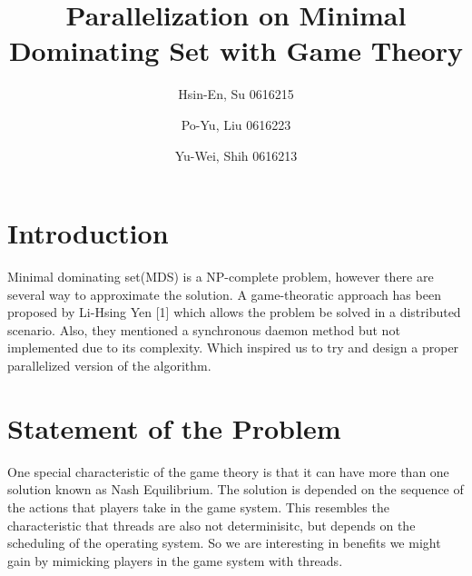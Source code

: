 \documentclass[sigconf]{acmart}
\begin{document}
\title{Parallelization on Minimal Dominating Set with Game Theory}

\author{Hsin-En, Su 0616215}
\author{Po-Yu, Liu 0616223}
\author{Yu-Wei, Shih 0616213}



\renewcommand{\shortauthors}{Trovato and Tobin, et al.}



\maketitle

\section{Introduction}
Minimal dominating set(MDS) is a NP-complete problem, however there are several way to approximate the solution. A game-theoratic  approach has been proposed by Li-Hsing Yen [1] which allows the problem be solved in a distributed scenario. Also, they mentioned a synchronous daemon method but not implemented due to its complexity. Which inspired us to try and design a proper parallelized version of the algorithm.

\section{Statement of the Problem}
One special characteristic of the game theory is that it can have more than one solution known as Nash Equilibrium. The solution is depended on the sequence of the actions that players take in the game system. This resembles the characteristic that threads are also not determinisitc, but depends on the scheduling of the operating system. So we are interesting in benefits we might gain by mimicking players in the game system with threads.
\end{document}
